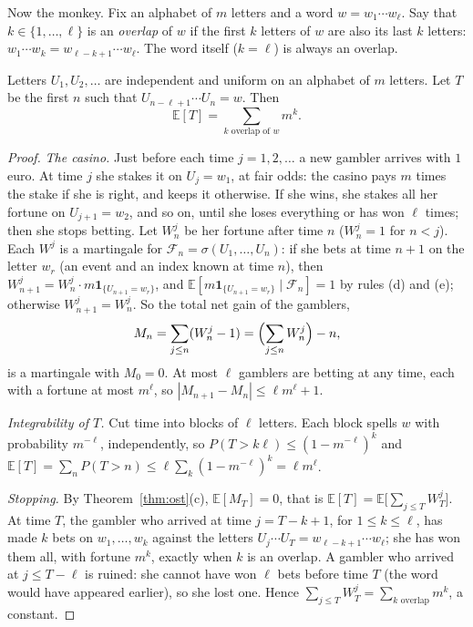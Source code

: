 Now the monkey. Fix an alphabet of $m$ letters and a word $w=w_1\cdots w_\ell$. Say that $k\in\{1,\dots,\ell\}$ is an \emph{overlap} of $w$ if the
first $k$ letters of $w$ are also its last $k$ letters: $w_1\cdots w_k=w_{\ell-k+1}\cdots w_\ell$. The word itself ($k=\ell$) is always an overlap.

\begin{theorem}\label{thm:abra}
Letters $U_1,U_2,\ldots$ are independent and uniform on an alphabet of $m$ letters. Let $T$ be the first $n$ such that $U_{n-\ell+1}\cdots U_n=w$. Then
\[
\mathbb E[T]=\sum_{k\text{ overlap of }w}m^k.
\]
\end{theorem}
\begin{proof}
\emph{The casino.} Just before each time $j=1,2,\ldots$ a new gambler arrives with $1$ euro. At time $j$ she stakes it on $U_j=w_1$, at fair odds:
the casino pays $m$ times the stake if she is right, and keeps it otherwise. If she wins, she stakes all her fortune on
$U_{j+1}=w_2$, and so on, until she loses everything or has won $\ell$ times; then she stops betting. Let $W^j_n$ be her fortune after time
$n$ ($W^j_n=1$ for $n<j$). Each $W^j$ is a martingale for $\mathcal F_n=\sigma(U_1,\dots,U_n)$: if she bets at time $n+1$ on the letter $w_r$ (an event and an index
known at time $n$), then $W^j_{n+1}=W^j_n\cdot m\mathbf 1_{\{U_{n+1}=w_r\}}$, and $\mathbb E[m\mathbf 1_{\{U_{n+1}=w_r\}}\mid\mathcal F_n]=1$ by rules (d) and (e); otherwise $W^j_{n+1}=W^j_n$.
So the total net gain of the gamblers,
\[
M_n=\sum_{j\le n}(W^j_n-1)=\Bigl(\sum_{j\le n}W^j_n\Bigr)-n,
\]
is a martingale with $M_0=0$. At most $\ell$ gamblers are betting at any time, each with a fortune at most $m^\ell$, so $|M_{n+1}-M_n|\le\ell m^\ell+1$.

\emph{Integrability of $T$.} Cut time into blocks of $\ell$ letters. Each block spells $w$ with probability $m^{-\ell}$, independently, so
$P(T>k\ell)\le(1-m^{-\ell})^k$ and $\mathbb E[T]=\sum_nP(T>n)\le\ell\sum_k(1-m^{-\ell})^k=\ell m^\ell$.

\emph{Stopping.} By Theorem~\ref{thm:ost}(c), $\mathbb E[M_T]=0$, that is $\mathbb E[T]=\mathbb E\bigl[\sum_{j\le T}W^j_T\bigr]$. At time $T$, the gambler who arrived at time $j=T-k+1$, for
$1\le k\le\ell$, has made $k$ bets on $w_1,\dots,w_k$ against the letters $U_j\cdots U_T=w_{\ell-k+1}\cdots w_\ell$; she has won them all, with fortune $m^k$, exactly
when $k$ is an overlap. A gambler who arrived at $j\le T-\ell$ is ruined: she cannot have won $\ell$ bets before time $T$ (the word would have
appeared earlier), so she lost one. Hence $\sum_{j\le T}W^j_T=\sum_{k\text{ overlap}}m^k$, a constant.
\end{proof}


